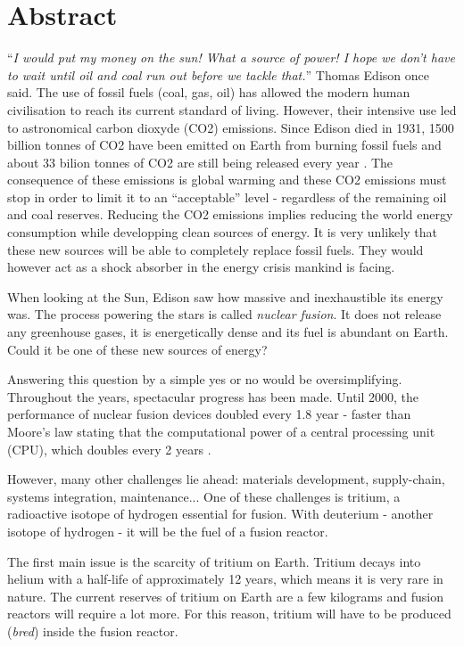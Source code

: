 \chapter*{Abstract}

``\textit{I would put my money on the sun! What a source of power! I hope we don't have to wait until oil and coal run out before we tackle that.}'' Thomas Edison once said.
The use of fossil fuels (coal, gas, oil) has allowed the modern human civilisation to reach its current standard of living.
However, their intensive use led to astronomical carbon dioxyde (CO2) emissions.
Since Edison died in 1931, 1500 billion tonnes of CO2 have been emitted on Earth from burning fossil fuels and about 33 bilion tonnes of CO2 are still being released every year \cite{friedlingstein_global_2021}.
The consequence of these emissions is global warming and these CO2 emissions must stop in order to limit it to an ``acceptable'' level - regardless of the remaining oil and coal reserves.
Reducing the CO2 emissions implies reducing the world energy consumption while developping clean sources of energy.
It is very unlikely that these new sources will be able to completely replace fossil fuels.
They would however act as a shock absorber in the energy crisis mankind is facing.

When looking at the Sun, Edison saw how massive and inexhaustible its energy was.
The process powering the stars is called \textit{nuclear fusion}.
It does not release any greenhouse gases, it is energetically dense and its fuel is abundant on Earth.
Could it be one of these new sources of energy?

Answering this question by a simple yes or no would be oversimplifying.
Throughout the years, spectacular progress has been made.
Until 2000, the performance of nuclear fusion devices doubled every 1.8 year - faster than Moore's law stating that the computational power of a central processing unit (CPU), which doubles every 2 years \cite{webster_fusion_2003}.

However, many other challenges lie ahead: materials development, supply-chain, systems integration, maintenance...
One of these challenges is tritium, a radioactive isotope of hydrogen essential for fusion.
With deuterium - another isotope of hydrogen - it will be the fuel of a fusion reactor.

The first main issue is the scarcity of tritium on Earth.
Tritium decays into helium with a half-life of approximately 12 years, which means it is very rare in nature.
The current reserves of tritium on Earth are a few kilograms and fusion reactors will require a lot more.
For this reason, tritium will have to be produced (\textit{bred}) inside the fusion reactor.

